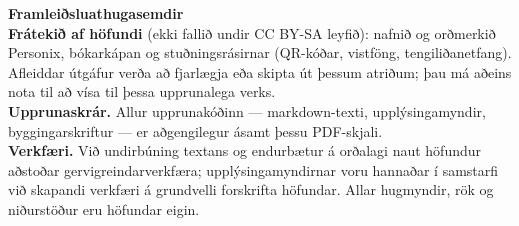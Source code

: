 \clearpage
\thispagestyle{empty}
\begin{flushleft}\small\sffamily
\textbf{Framleiðsluathugasemdir}\\[1.2em]

\textbf{Frátekið af höfundi} (ekki fallið undir CC BY-SA leyfið): nafnið og
orðmerkið Personix, bókarkápan og stuðningsrásirnar (QR-kóðar, vistföng,
tengiliðanetfang). Afleiddar útgáfur verða að fjarlægja eða skipta út þessum
atriðum; þau má aðeins nota til að vísa til þessa upprunalega verks.\\[1.2em]

\textbf{Upprunaskrár.} Allur upprunakóðinn --- markdown-texti, upplýsingamyndir,
byggingarskriftur --- er aðgengilegur ásamt þessu PDF-skjali.\\[1.2em]

\textbf{Verkfæri.} Við undirbúning textans og endurbætur á orðalagi naut
höfundur aðstoðar gervigreindarverkfæra; upplýsingamyndirnar voru hannaðar
í samstarfi við skapandi verkfæri á grundvelli forskrifta höfundar.
Allar hugmyndir, rök og niðurstöður eru höfundar eigin.
\end{flushleft}
\clearpage
